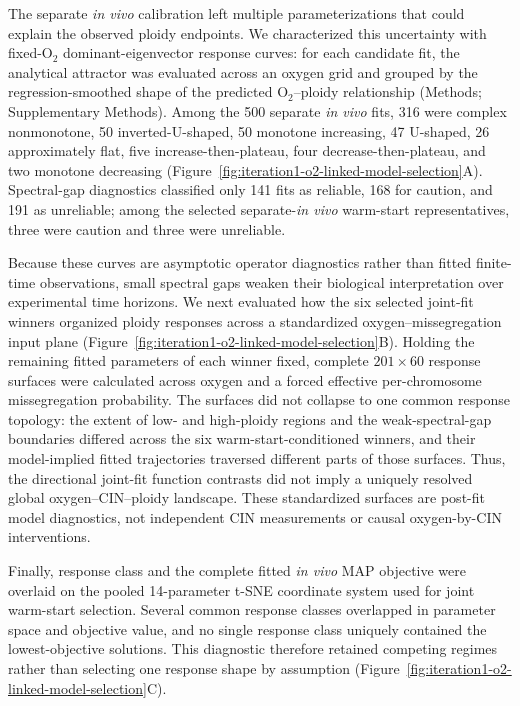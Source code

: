\documentclass[11pt]{article}
\begin{document}
The separate \textit{in vivo} calibration left multiple parameterizations that could explain the observed ploidy endpoints. We characterized this uncertainty with fixed-O$_2$ dominant-eigenvector response curves: for each candidate fit, the analytical attractor was evaluated across an oxygen grid and grouped by the regression-smoothed shape of the predicted O$_2$--ploidy relationship (Methods; Supplementary Methods). Among the 500 separate \textit{in vivo} fits, 316 were complex nonmonotone, 50 inverted-U-shaped, 50 monotone increasing, 47 U-shaped, 26 approximately flat, five increase-then-plateau, four decrease-then-plateau, and two monotone decreasing (Figure~\ref{fig:iteration1-o2-linked-model-selection}A). Spectral-gap diagnostics classified only 141 fits as reliable, 168 for caution, and 191 as unreliable; among the selected separate-\textit{in vivo} warm-start representatives, three were caution and three were unreliable.

Because these curves are asymptotic operator diagnostics rather than fitted finite-time observations, small spectral gaps weaken their biological interpretation over experimental time horizons. We next evaluated how the six selected joint-fit winners organized ploidy responses across a standardized oxygen--missegregation input plane (Figure~\ref{fig:iteration1-o2-linked-model-selection}B). Holding the remaining fitted parameters of each winner fixed, complete \(201\times60\) response surfaces were calculated across oxygen and a forced effective per-chromosome missegregation probability. The surfaces did not collapse to one common response topology: the extent of low- and high-ploidy regions and the weak-spectral-gap boundaries differed across the six warm-start-conditioned winners, and their model-implied fitted trajectories traversed different parts of those surfaces. Thus, the directional joint-fit function contrasts did not imply a uniquely resolved global oxygen--CIN--ploidy landscape. These standardized surfaces are post-fit model diagnostics, not independent CIN measurements or causal oxygen-by-CIN interventions.

Finally, response class and the complete fitted \textit{in vivo} MAP objective were overlaid on the pooled 14-parameter t-SNE coordinate system used for joint warm-start selection. Several common response classes overlapped in parameter space and objective value, and no single response class uniquely contained the lowest-objective solutions. This diagnostic therefore retained competing regimes rather than selecting one response shape by assumption (Figure~\ref{fig:iteration1-o2-linked-model-selection}C).
\end{document}
